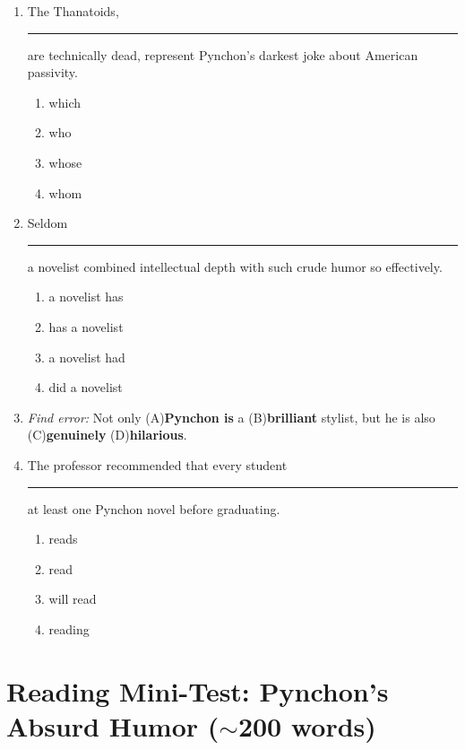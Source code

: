\documentclass[10pt,a4paper]{article}
\begin{document}
\begin{enumerate}[label=\textbf{\arabic*.}, start=11, leftmargin=*]
\item The Thanatoids, \rule{2cm}{0.4pt} are technically dead,
represent Pynchon's darkest joke about American passivity.
\begin{enumerate}[label=(\Alph*)]
\item which \item who \item whose \item whom
\end{enumerate}

\item Seldom \rule{2cm}{0.4pt} a novelist combined intellectual
depth with such crude humor so effectively.
\begin{enumerate}[label=(\Alph*)]
\item a novelist has \item has a novelist
\item a novelist had \item did a novelist
\end{enumerate}

\item \textit{Find error:}
Not only (A)\textbf{Pynchon is} a (B)\textbf{brilliant} stylist,
but he is also (C)\textbf{genuinely} (D)\textbf{hilarious}.

\item The professor recommended that every student \rule{2cm}{0.4pt}
at least one Pynchon novel before graduating.
\begin{enumerate}[label=(\Alph*)]
\item reads \item read \item will read \item reading
\end{enumerate}
\end{enumerate}

\section*{Reading Mini-Test: Pynchon's Absurd Humor ($\sim$200 words)}
\end{document}
